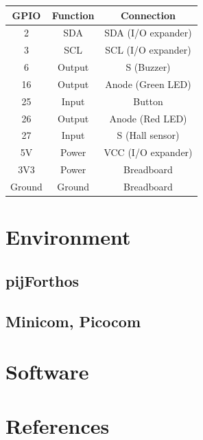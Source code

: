 \documentclass[]{article}
\begin{document}
\begin{center}
    \begin{tabular}{ |c|c|c| } 
        \hline
        GPIO & Function & Connection \\
        \hline
        2 & SDA & SDA (I/O expander) \\
        3 & SCL & SCL (I/O expander) \\
        6 & Output & S (Buzzer) \\
        16 & Output & Anode (Green LED) \\
        25 & Input & Button \\
        26 & Output & Anode (Red LED) \\
        27 & Input & S (Hall sensor) \\
        5V & Power & VCC (I/O expander) \\
        3V3 & Power & Breadboard \\
        Ground & Ground & Breadboard \\
        \hline
    \end{tabular}
\end{center}

\section{Environment}

\subsection{pijForthos}

\subsection{Minicom, Picocom}

\section{Software}

\section{References}
\end{document}

